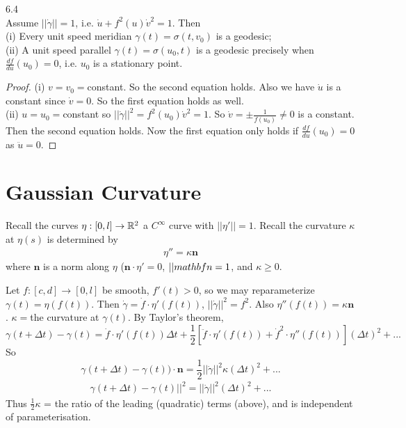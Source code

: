 \documentclass[a4paper]{article}
\begin{document}
\begin{prop} 6.4\\
Assume $||\dot{\gamma}||=1$, i.e. $\dot{u}+f^2(u)\dot{v}^2=1$. Then\\
(i) Every unit speed meridian $\gamma(t) = \sigma(t,v_0)$ is a geodesic;\\
(ii) A unit speed parallel $\gamma(t) = \sigma(u_0,t)$ is a geodesic precisely when $\frac{df}{du}(u_0)=0$, i.e. $u_0$ is a stationary point.
\begin{proof}
(i) $v=v_0=$constant. So the second equation holds. Also we have $\dot{u}$ is a constant since $\dot{v} = 0$. So the first equation holds as well.\\
(ii) $u=u_0=$constant so $||\dot{\gamma}||^2 = f^2(u_0) \dot{v}^2 = 1$. So $\dot{v} = \pm \frac{1}{f(u_0)} \neq 0$ is a constant. Then the second equation holds. Now the first equation only holds if $\frac{df}{du}(u_0) = 0$ as $\ddot{u} = 0$.
\end{proof}
\end{prop}

\newpage

\section{Gaussian Curvature}
Recall the curves $\eta:[0,l] \to \mathbb{R}^2$ a $C^\infty$ curve with $||\eta'||=1$. Recall the curvature $\kappa$ at $\eta(s)$ is determined by
\begin{equation*}
\begin{aligned}
\eta'' = \kappa \mathbf{n}
\end{aligned}
\end{equation*}
where $\mathbf{n}$ is a norm along $\eta$ ($\mathbf{n} \cdot \eta'=0$, $||\\mathbf{n}=1$, and $\kappa \geq 0$.

Let $f:[c,d] \to [0,l]$ be smooth, $f'(t)>0$, so we may reparameterize $\gamma(t) = \eta(f(t))$. Then $\dot{\gamma} = \dot{f}\cdot \eta'(f(t))$, $||\dot{\gamma}||^2 = f^2$. Also $\eta''(f(t)) = \kappa \mathbf{n}$. $\kappa = $the curvature at $\gamma(t)$. By Taylor's theorem, $$\gamma(t+\Delta t) - \gamma(t) = \dot{f} \cdot \eta' (f(t)) \Delta t + \frac{1}{2} [ \ddot{f} \cdot \eta'(f(t))+\dot{f}^2 \cdot \eta'' (f(t))](\Delta t)^2 + ...$$ So $$\gamma(t+\Delta t) - \gamma(t)) \cdot \mathbf{n} = \frac{1}{2} ||\dot{\gamma}||^2 \kappa (\Delta t)^2 + ...$$
\begin{equation*}
\begin{aligned}
\gamma(t+\Delta t)-\gamma(t)||^2 = ||\dot{\gamma}||^2 (\Delta t)^2 + ...
\end{aligned}
\end{equation*}
Thus $\frac{1}{2} \kappa$ = the ratio of the leading (quadratic) terms (above), and is independent of parameterisation.
\end{document}
